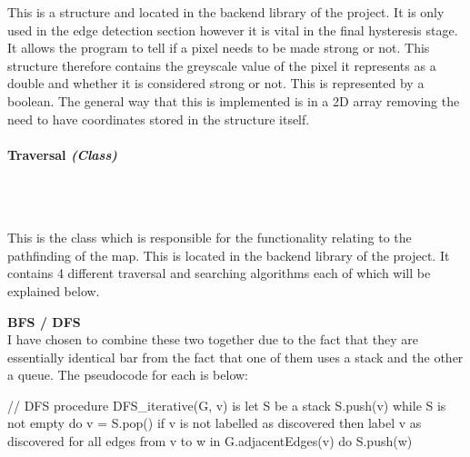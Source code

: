 \begin{FlushLeft}
    This is a structure and located in the backend library of the project. It is only used in the edge detection section however it is vital in the final hysteresis stage. It allows the program to tell if a pixel needs to be made strong or not. This structure therefore contains the greyscale value of the pixel it represents as a double and whether it is considered strong or not. This is represented by a boolean. The general way that this is implemented is in a 2D array removing the need to have coordinates stored in the structure itself.

    \bk

    \pagebreak
\paragraph{Traversal \textit{(Class)}} \mbox{} \\

    \begin{figure}[H]
        \centering
    \end{figure}\\

    This is the class which is responsible for the functionality relating to the pathfinding of the map. This is located in the backend library of the project. It contains 4 different traversal and searching algorithms each of which will be explained below. \\ \bk

    \textbf{BFS / DFS} \\
    I have chosen to combine these two together due to the fact that they are essentially identical bar from the fact that one of them uses a stack and the other a queue. The pseudocode for each is below:\\
    \begin{pseudocode}
// DFS
procedure DFS_iterative(G, v) is
let S be a stack
S.push(v)
while S is not empty do
    v = S.pop()
    if v is not labelled as discovered then
        label v as discovered
        for all edges from v to w in G.adjacentEdges(v) do 
            S.push(w)


\end{pseudocode}
\end{FlushLeft}
